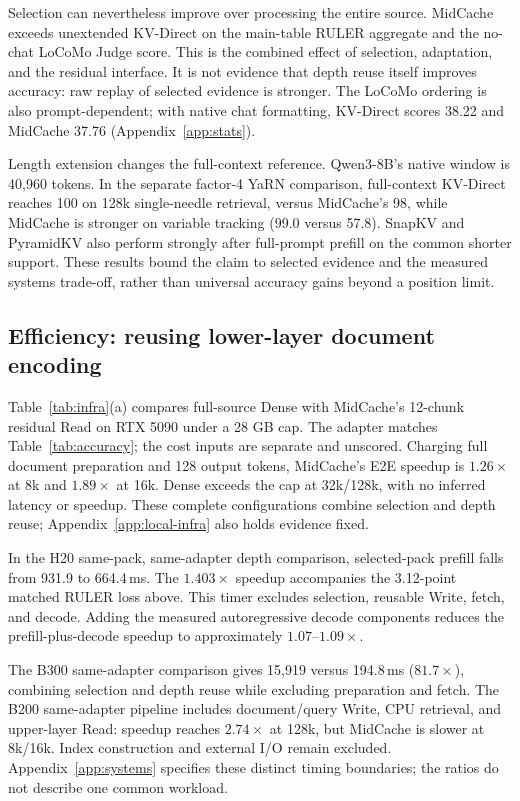 Selection can nevertheless improve over processing the entire source. MidCache exceeds unextended KV-Direct on the main-table RULER aggregate and the no-chat LoCoMo Judge score. This is the combined effect of selection, adaptation, and the residual interface. It is not evidence that depth reuse itself improves accuracy: raw replay of selected evidence is stronger. The LoCoMo ordering is also prompt-dependent; with native chat formatting, KV-Direct scores 38.22 and MidCache 37.76 (Appendix~\ref{app:stats}).

Length extension changes the full-context reference. Qwen3-8B's native window is 40,960 tokens. In the separate factor-4 YaRN comparison, full-context KV-Direct reaches 100 on 128k single-needle retrieval, versus MidCache's 98, while MidCache is stronger on variable tracking (99.0 versus 57.8). SnapKV and PyramidKV also perform strongly after full-prompt prefill on the common shorter support. These results bound the claim to selected evidence and the measured systems trade-off, rather than universal accuracy gains beyond a position limit.

\subsection{Efficiency: reusing lower-layer document encoding}
\label{sec:infra}

Table~\ref{tab:infra}(a) compares full-source Dense with MidCache's 12-chunk residual Read on RTX 5090 under a 28 GB cap. The adapter matches Table~\ref{tab:accuracy}; the cost inputs are separate and unscored. Charging full document preparation and 128 output tokens, MidCache's E2E speedup is $1.26\times$ at 8k and $1.89\times$ at 16k. Dense exceeds the cap at 32k/128k, with no inferred latency or speedup. These complete configurations combine selection and depth reuse; Appendix~\ref{app:local-infra} also holds evidence fixed.

In the H20 same-pack, same-adapter depth comparison, selected-pack prefill falls from 931.9 to 664.4\,ms. The $1.403\times$ speedup accompanies the 3.12-point matched RULER loss above. This timer excludes selection, reusable Write, fetch, and decode. Adding the measured autoregressive decode components reduces the prefill-plus-decode speedup to approximately $1.07$--$1.09\times$.

The B300 same-adapter comparison gives 15,919 versus 194.8\,ms ($81.7\times$), combining selection and depth reuse while excluding preparation and fetch. The B200 same-adapter pipeline includes document/query Write, CPU retrieval, and upper-layer Read: speedup reaches $2.74\times$ at 128k, but MidCache is slower at 8k/16k. Index construction and external I/O remain excluded. Appendix~\ref{app:systems} specifies these distinct timing boundaries; the ratios do not describe one common workload.

